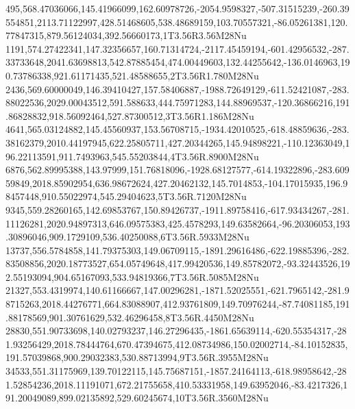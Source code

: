 495,568.47036066,145.41966099,162.60978726,-2054.9598327,-507.31515239,-260.39554851,2113.71122997,428.51468605,538.48689159,103.70557321,-86.05261381,120.77847315,879.56124034,392.56660173,1T3.56R3.56M28Nu
1191,574.27422341,147.32356657,160.71314724,-2117.45459194,-601.42956532,-287.33733648,2041.63698813,542.87885454,474.00449603,132.44255642,-136.0146963,190.73786338,921.61171435,521.48588655,2T3.56R1.780M28Nu
2436,569.60000049,146.39410427,157.58406887,-1988.72649129,-611.52421087,-283.88022536,2029.00043512,591.588633,444.75971283,144.88969537,-120.36866216,191.86828832,918.56092464,527.87300512,3T3.56R1.186M28Nu
4641,565.03124882,145.45560937,153.56708715,-1934.42010525,-618.48859636,-283.38162379,2010.44197945,622.25805711,427.20344265,145.94898221,-110.12363049,196.22113591,911.7493963,545.55203844,4T3.56R.8900M28Nu
6876,562.89995388,143.97999,151.76818096,-1928.68127577,-614.19322896,-283.60959849,2018.85902954,636.98672624,427.20462132,145.7014853,-104.17015935,196.98457448,910.55022974,545.29404623,5T3.56R.7120M28Nu
9345,559.28260165,142.69853767,150.89426737,-1911.89758416,-617.93434267,-281.11126281,2020.94897313,646.09575383,425.4578293,149.63582664,-96.20306053,193.30896046,909.1729109,536.40250088,6T3.56R.5933M28Nu
13737,556.5784858,141.79375303,149.06709115,-1891.29616486,-622.19885396,-282.83508856,2020.18773527,654.05749648,417.99420536,149.85782072,-93.32443526,192.55193094,904.65167093,533.94819366,7T3.56R.5085M28Nu
21327,553.4319974,140.61166667,147.00296281,-1871.52025551,-621.7965142,-281.98715263,2018.44276771,664.83088907,412.93761809,149.70976244,-87.74081185,191.88178569,901.30761629,532.46296458,8T3.56R.4450M28Nu
28830,551.90733698,140.02793237,146.27296435,-1861.65639114,-620.55354317,-281.93256429,2018.78444764,670.47394675,412.08734986,150.02002714,-84.10152835,191.57039868,900.29032383,530.88713994,9T3.56R.3955M28Nu
34533,551.31175969,139.70122115,145.75687151,-1857.24164113,-618.98958642,-281.52854236,2018.11191071,672.21755658,410.53331958,149.63952046,-83.4217326,191.20049089,899.02135892,529.60245674,10T3.56R.3560M28Nu
